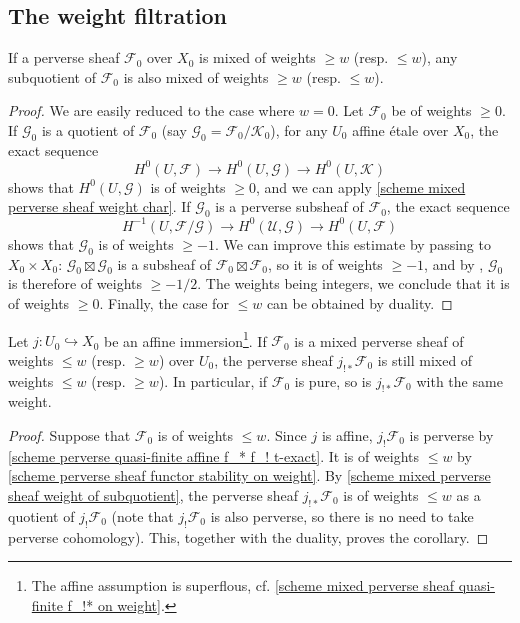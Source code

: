 \subsection{The weight filtration}
\begin{proposition}\label{scheme mixed perverse sheaf weight of subquotient}
If a perverse sheaf $\mathscr{F}_0$ over $X_0$ is mixed of weights $\geq w$ (resp. $\leq w$), any subquotient of $\mathscr{F}_0$ is also mixed of weights $\geq w$ (resp. $\leq w$).
\end{proposition}
\begin{proof}
We are easily reduced to the case where $w=0$. Let $\mathscr{F}_0$ be of weights $\geq 0$. If $\mathscr{G}_0$ is a quotient of $\mathscr{F}_0$ (say $\mathscr{G}_0=\mathscr{F}_0/\mathscr{K}_0$), for any $U_0$ affine \'etale over $X_0$, the exact sequence
\[H^0(U,\mathscr{F})\to H^0(U,\mathscr{G})\to H^0(U,\mathscr{K})\]
shows that $H^0(U,\mathscr{G})$ is of weights $\geq 0$, and we can apply \cref{scheme mixed perverse sheaf weight char}. If $\mathscr{G}_0$ is a perverse subsheaf of $\mathscr{F}_0$, the exact sequence
\[H^{-1}(U,\mathscr{F}/\mathscr{G})\to H^0(\mathscr{U},\mathscr{G})\to H^0(U,\mathscr{F})\]
shows that $\mathscr{G}_0$ is of weights $\geq -1$. We can improve this estimate by passing to $X_0\times X_0$: $\mathscr{G}_0\boxtimes\mathscr{G}_0$ is a subsheaf of $\mathscr{F}_0\boxtimes\mathscr{F}_0$, so it is of weights $\geq -1$, and by \cite[5.1.14.1*]{BBD}, $\mathscr{G}_0$ is therefore of weights $\geq -1/2$. The weights being integers, we conclude that it is of weights $\geq 0$. Finally, the case for $\leq w$ can be obtained by duality.
\end{proof}

\begin{corollary}\label{scheme mixed perverse sheaf weight under j_!* preverse}
Let $j:U_0\hookrightarrow X_0$ be an affine immersion\footnote{The affine assumption is superflous, cf. \cref{scheme mixed perverse sheaf quasi-finite f_!* on weight}.}. If $\mathscr{F}_0$ is a mixed perverse sheaf of weights $\leq w$ (resp. $\geq w$) over $U_0$, the perverse sheaf $j_{!*}\mathscr{F}_0$ is still mixed of weights $\leq w$ (resp. $\geq w$). In particular, if $\mathscr{F}_0$ is pure, so is $j_{!*}\mathscr{F}_0$ with the same weight.
\end{corollary}
\begin{proof}
Suppose that $\mathscr{F}_0$ is of weights $\leq w$. Since $j$ is affine, $j_!\mathscr{F}_0$ is perverse by \cref{scheme perverse quasi-finite affine f_* f_! t-exact}. It is of weights $\leq w$ by \cref{scheme perverse sheaf functor stability on weight}. By \cref{scheme mixed perverse sheaf weight of subquotient}, the perverse sheaf $j_{!*}\mathscr{F}_0$ is of weights $\leq w$ as a quotient of $j_!\mathscr{F}_0$ (note that $j_!\mathscr{F}_0$ is also perverse, so there is no need to take perverse cohomology). This, together with the duality, proves the corollary.
\end{proof}

